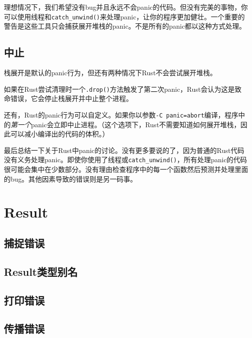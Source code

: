 理想情况下，我们希望没有bug并且永远不会panic的代码。但没有完美的事物，你可以使用线程和\texttt{catch\_unwind()}来处理panic，让你的程序更加健壮。一个重要的警告是这些工具只会捕获展开堆栈的panic。不是所有的panic都以这种方式处理。

\subsection{中止}
栈展开是默认的panic行为，但还有两种情况下Rust不会尝试展开堆栈。

如果在Rust尝试清理时一个\texttt{.drop()}方法触发了第二次panic，Rust会认为这是致命错误，它会停止栈展开并中止整个进程。

还有，Rust的panic行为可以自定义。如果你以参数\texttt{-C panic=abort}编译，程序中的\emph{第一个}panic会立即中止进程。（这个选项下，Rust不需要知道如何展开堆栈，因此可以减小编译出的代码的体积。）

最后总结一下关于Rust中panic的讨论。没有更多要说的了，因为普通的Rust代码没有义务处理panic。即使你使用了线程或\texttt{catch\_unwind()}，所有处理panic的代码很可能会集中在少数部分。没有理由检查程序中的每一个函数然后预测并处理里面的bug。其他因素导致的错误则是另一码事。

\section{Result}

\subsection{捕捉错误}

\subsection{Result类型别名}

\subsection{打印错误}

\subsection{传播错误}\label{properror}